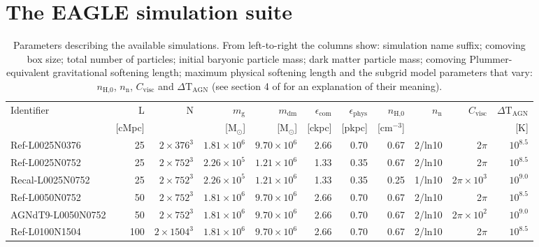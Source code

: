 \section{The EAGLE simulation suite}
\label{eagle_sim_suite}

\begin{table}
\small
\begin{center}
\renewcommand{\arraystretch}{1.5}
\begin{tabular}{lrrrrrrrrrr}
\hline
Identifier & L & N & $m_{\text{g}}$ & $m_{\text{dm}}$ & $\epsilon_{\text{com}}$ & $\epsilon_{\text{phys}}$ & $n_{\text{H,0}}$ & $n_{\text{n}}$ & $C_{\text{visc}}$ & $\Delta \text{T}_{\text{AGN}}$\\
& [cMpc] &  & [M$_{\odot}$] & [M$_{\odot}$] & [ckpc] & [pkpc] & [cm$^{-3}$] & & & [K]\\
\hline\hline
Ref-L0025N0376 & 25 & $2{\times}376^{3}$ & $1.81{\times}10^{6}$ & $9.70{\times}10^{6}$ & 2.66 & 0.70 & 0.67 & 2/ln10 & 2$\pi$ & $10^{8.5}$\\
Ref-L0025N0752 & 25 & $2{\times}752^{3}$ & $2.26{\times}10^{5}$ & $1.21{\times}10^{6}$ & 1.33 & 0.35 & 0.67 & 2/ln10 & 2$\pi$ & $10^{8.5}$\\
Recal-L0025N0752 & 25 & $2{\times}752^{3}$ & $2.26{\times}10^{5}$ & $1.21{\times}10^{6}$ & 1.33 & 0.35 & 0.25 & 1/ln10& 2$\pi{\times} 10^3$ & $10^{9.0}$\\
Ref-L0050N0752 & 50 & $2{\times}752^{3}$ & $1.81{\times}10^{6}$ & $9.70{\times}10^{6}$ & 2.66 & 0.70 & 0.67 & 2/ln10& 2$\pi$ & $10^{8.5}$\\
AGNdT9-L0050N0752 & 50 & $2{\times}752^{3}$ & $1.81{\times}10^{6}$ & $9.70{\times}10^{6}$ & 2.66 & 0.70 &0.67& 2/ln10& 2$\pi{\times} 10^2$ & $10^{9.0}$\\
Ref-L0100N1504 & 100 & $2{\times}1504^{3}$ & $1.81{\times}10^{6}$ & $9.70{\times}10^{6}$ & 2.66 & 0.70 & 0.67 & 2/ln10& 2$\pi$ & $10^{8.5}$\\
\hline
\end{tabular}
\end{center}
\caption{Parameters describing the available simulations. From
  left-to-right the columns show: simulation name suffix; comoving box size;
  total number of particles; initial baryonic particle mass; dark matter
  particle mass; comoving Plummer-equivalent gravitational softening length;
  maximum physical softening length and the subgrid model parameters that vary:
  $n_{\text{H,0}}$, $n_{\text{n}}$, $C_{\text{visc}}$ and $\Delta
  \text{T}_{\text{AGN}}$ (see section 4 of \citet{Schaye2015} for an explanation of their
  meaning).}
\label{table_simulation_list}
\end{table}

